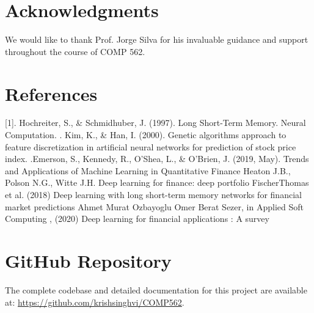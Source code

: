 \documentclass{article}
\begin{document}
\section{Acknowledgments}

We would like to thank Prof. Jorge Silva for his invaluable guidance and support throughout the course of COMP 562.

\section{References}

[1].	Hochreiter, S., \& Schmidhuber, J. (1997). Long Short-Term Memory. Neural Computation. 
\newline
\newline
[2].	Kim, K., \& Han, I. (2000). Genetic algorithms approach to feature discretization in artificial neural networks for prediction of stock price index.
\newline
\newline
[3].Emerson, S., Kennedy, R., O’Shea, L., & O’Brien, J. (2019, May). Trends and Applications of Machine Learning in Quantitative Finance
\newline
\newline
[4] Heaton J.B., Polson N.G., Witte J.H. Deep learning for finance: deep portfolio
\newline
\newline
[5] FischerThomas et al. (2018)
Deep learning with long short-term memory networks for financial market predictions
\newline
\newline
[6] Ahmet Murat Ozbayoglu Omer Berat Sezer, in 
Applied Soft Computing
, (2020) Deep learning for financial applications : A survey
 \section{GitHub Repository}
The complete codebase and detailed documentation for this project are available at:
\newline
\newline
\url{https://github.com/krishsinghvi/COMP562}.
\end{document}
